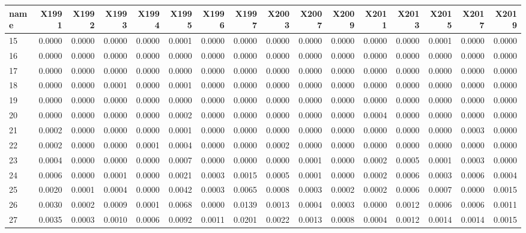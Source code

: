 \documentclass[
  11pt,
]{article}
\begin{document}
\begin{tabular}{l|r|r|r|r|r|r|r|r|r|r|r|r|r|r|r}
\hline
name & X1991 & X1992 & X1993 & X1994 & X1995 & X1996 & X1997 & X2003 & X2007 & X2009 & X2011 & X2013 & X2015 & X2017 & X2019\\
\hline
15 & 0.0000 & 0.0000 & 0.0000 & 0.0000 & 0.0001 & 0.0000 & 0.0000 & 0.0000 & 0.0000 & 0.0000 & 0.0000 & 0.0000 & 0.0001 & 0.0000 & 0.0000\\
\hline
16 & 0.0000 & 0.0000 & 0.0000 & 0.0000 & 0.0000 & 0.0000 & 0.0000 & 0.0000 & 0.0000 & 0.0000 & 0.0000 & 0.0000 & 0.0000 & 0.0000 & 0.0000\\
\hline
17 & 0.0000 & 0.0000 & 0.0000 & 0.0000 & 0.0000 & 0.0000 & 0.0000 & 0.0000 & 0.0000 & 0.0000 & 0.0000 & 0.0000 & 0.0000 & 0.0000 & 0.0000\\
\hline
18 & 0.0000 & 0.0000 & 0.0001 & 0.0000 & 0.0001 & 0.0000 & 0.0000 & 0.0000 & 0.0000 & 0.0000 & 0.0000 & 0.0000 & 0.0000 & 0.0000 & 0.0000\\
\hline
19 & 0.0000 & 0.0000 & 0.0000 & 0.0000 & 0.0000 & 0.0000 & 0.0000 & 0.0000 & 0.0000 & 0.0000 & 0.0000 & 0.0000 & 0.0000 & 0.0000 & 0.0000\\
\hline
20 & 0.0000 & 0.0000 & 0.0000 & 0.0000 & 0.0002 & 0.0000 & 0.0000 & 0.0000 & 0.0000 & 0.0000 & 0.0004 & 0.0000 & 0.0000 & 0.0000 & 0.0000\\
\hline
21 & 0.0002 & 0.0000 & 0.0000 & 0.0000 & 0.0001 & 0.0000 & 0.0000 & 0.0000 & 0.0000 & 0.0000 & 0.0000 & 0.0000 & 0.0000 & 0.0003 & 0.0000\\
\hline
22 & 0.0002 & 0.0000 & 0.0000 & 0.0001 & 0.0004 & 0.0000 & 0.0000 & 0.0002 & 0.0000 & 0.0000 & 0.0000 & 0.0000 & 0.0000 & 0.0000 & 0.0000\\
\hline
23 & 0.0004 & 0.0000 & 0.0000 & 0.0000 & 0.0007 & 0.0000 & 0.0000 & 0.0000 & 0.0001 & 0.0000 & 0.0002 & 0.0005 & 0.0001 & 0.0003 & 0.0000\\
\hline
24 & 0.0006 & 0.0000 & 0.0001 & 0.0000 & 0.0021 & 0.0003 & 0.0015 & 0.0005 & 0.0001 & 0.0000 & 0.0002 & 0.0006 & 0.0003 & 0.0006 & 0.0004\\
\hline
25 & 0.0020 & 0.0001 & 0.0004 & 0.0000 & 0.0042 & 0.0003 & 0.0065 & 0.0008 & 0.0003 & 0.0002 & 0.0002 & 0.0006 & 0.0007 & 0.0000 & 0.0015\\
\hline
26 & 0.0030 & 0.0002 & 0.0009 & 0.0001 & 0.0068 & 0.0000 & 0.0139 & 0.0013 & 0.0004 & 0.0003 & 0.0000 & 0.0012 & 0.0006 & 0.0006 & 0.0011\\
\hline
27 & 0.0035 & 0.0003 & 0.0010 & 0.0006 & 0.0092 & 0.0011 & 0.0201 & 0.0022 & 0.0013 & 0.0008 & 0.0004 & 0.0012 & 0.0014 & 0.0014 & 0.0015\\

\end{tabular}
\end{document}
